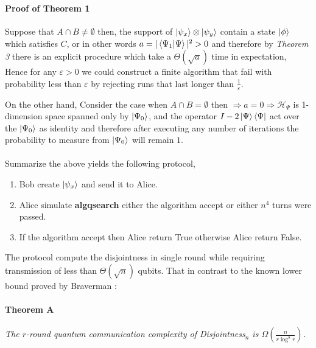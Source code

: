 \documentclass{article}
\begin{document}
\begin{multicols}{2}
\paragraph{} 

\paragraph{Proof of Theorem 1} 
Suppose that \( A \cap B \neq \emptyset \) then, the support of \( \ket{\psi_x} \otimes \ket{\psi_y} \) contain a state \( \ket{\phi} \) which satisfies \(C\), or in other words $a = |\braket{\Psi_1|\Psi}|^2 > 0 $ and therefore by \textit{Theorem 3} there is an explicit procedure which take a $\Theta(\sqrt{a})$ time in expectation, Hence for any \(\varepsilon >0\) we could construct a finite algorithm that fail with probability less than $ \varepsilon $ by rejecting runs that last longer than $\frac{1}{\varepsilon}$. 
  
On the other hand, Consider the case when \(A \cap B = \emptyset\) then $\Rightarrow a = 0 \Rightarrow \mathcal{H}_{\Psi}$ is 1-dimension space spanned only by $\ket{\Psi_0} $, and the operator $ I - 2 \ket{\Psi}\bra{\Psi} $ act over the $ \ket{\Psi_0}  $ as identity and therefore after executing any number of iterations the probability to measure from $\ket{\Psi_0}$ will remain $1$.

\paragraph{}Summarize the above yields the following protocol,
\begin{enumerate}
    \item Bob create \( \ket{\psi_x} \) and send it to Alice.
    \item Alice simulate \textbf{algqsearch} either the algorithm accept or either $n^4$ turns were passed.     
    \item If the algorithm accept then Alice return True otherwise Alice return False. 
\end{enumerate}

The protocol compute the disjointness in single round while requiring transmission of less than $\Theta\left( \sqrt{n} \right)$ qubits. That in contrast to the known lower bound proved by Braverman \cite{Braverman}: 
\paragraph{Theorem A} \textit{The $r$-round quantum communication complexity of Disjointness$_n$ is $ \Omega\left( \frac{n}{r \log^8 r} \right)$.} 

\end{multicols}
\end{document}
